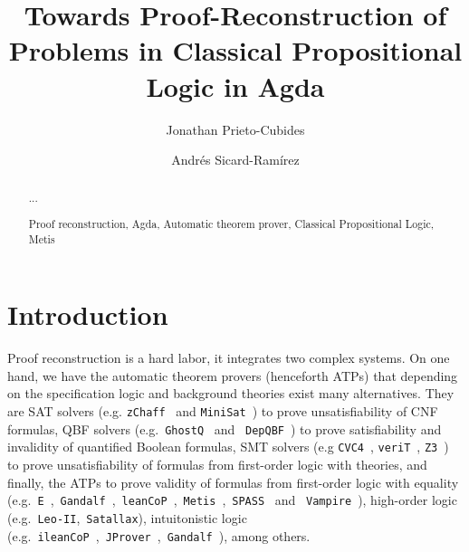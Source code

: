 \documentclass[runningheads,a4paper]{llncs}
\newcommand{\keywords}[1]{\par\addvspace\baselineskip
\noindent\keywordname\enspace\ignorespaces#1}
\begin{document}
\mainmatter  %

\title{Towards Proof-Reconstruction of Problems in Classical Propositional Logic
in Agda}


\author{Jonathan Prieto-Cubides%
\and Andr\'es Sicard-Ram\'irez}
%


\maketitle


\begin{abstract}
...
\keywords{Proof reconstruction, Agda, Automatic theorem prover, Classical Propositional Logic, Metis }
\end{abstract}

\section{Introduction}
Proof reconstruction is a hard labor, it integrates two
complex systems. On one hand, we have the automatic theorem provers (henceforth
ATPs) that depending on the specification logic and background theories exist
many alternatives. They are SAT solvers (e.g. \verb!zChaff!~\cite{Moskewicz2001} and \verb!MiniSat!~\cite{Een2004}) to prove unsatisfiability of CNF formulas,
QBF solvers (e.g.~\verb!GhostQ!~\cite{Klieber2014} and ~\verb!DepQBF!~\cite{Lonsing2017}) to prove satisfiability and invalidity of quantified Boolean
formulas, SMT solvers (e.g \verb!CVC4!~\cite{Barrett2011}, \verb!veriT!~\cite{bouton2009}, \verb!Z3!~\cite{DeMoura2008}) to
prove unsatisfiability of formulas from first-order logic with theories,  and
finally, the ATPs to prove validity of formulas from first-order logic with
equality (e.g.~\verb!E!~\cite{Schulz:AICOM-2002},~\verb!Gandalf!~\cite{Tammet1997},~\verb!leanCoP!~\cite{Otten2008},~\verb!Metis!~\cite{hurd2003first},~\verb!SPASS!~\cite{Weidenbach2009} and ~\verb!Vampire!~\cite{Riazanov1999}),
high-order logic (e.g.~\verb!Leo-II!,~\verb!Satallax!), intuitonistic logic
(e.g.~\verb!ileanCoP!~\cite{Otten2008},~\verb!JProver!~\cite{Schmitt2001},~\verb!Gandalf!~\cite{Tammet1997}), among others.
\end{document}
